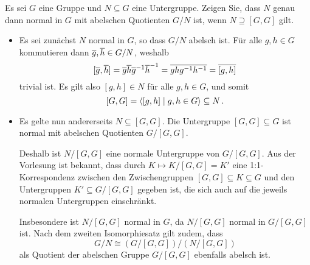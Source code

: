 \begin{question}[subtitle = Abelsche Quotienten]
  Es sei $G$ eine Gruppe und $N \subseteq G$ eine Untergruppe.
  Zeigen Sie, dass $N$ genau dann normal in $G$ mit abelschen Quotienten $G/N$ ist, wenn $N \supseteq [G,G]$ gilt.
\end{question}


\begin{solution}
  \begin{itemize}
    \item
      Es sei zunächst $N$ normal in $G$, so dass $G/N$ abelsch ist.
      Für alle $g, h \in G$ kommutieren dann $\overline{g}, \overline{h} \in G/N$, weshalb
      \[
          [\overline{g}, \overline{h}]
        = \overline{g} \overline{h} \overline{g}^{-1} \overline{h}^{-1}
        = \overline{g h g^{-1} h^{-1}}
        = \overline{[g,h]}
      \]
      trivial ist.
      Es gilt also $[g,h] \in N$ für alle $g, h \in G$, und somit
      \[
                  [G,G]
        =         \langle [g,h] \mid g, h \in G \rangle
        \subseteq N \,.
      \]
    \item
      Es gelte nun andererseits $N \subseteq [G,G]$.
      Die Untergruppe $[G,G] \subseteq G$ ist normal mit abelschen Quotienten $G/[G,G]$.
      
      Deshalb ist $N/[G,G]$ eine normale Untergruppe von $G/[G,G]$.
      Aus der Vorlesung ist bekannt, dass durch $K \mapsto K/[G,G] = K'$ eine 1:1-Korrespondenz zwischen den Zwischengruppen $[G,G] \subseteq K \subseteq G$ und den Untergruppen $K' \subseteq G/[G,G]$ gegeben ist, die sich auch auf die jeweils normalen Untergruppen einschränkt.
      
      Insbesondere ist $N/[G,G]$ normal in $G$, da $N/[G,G]$ normal in $G/[G,G]$ ist.
      Nach dem zweiten Isomorphiesatz gilt zudem, dass
      \[
              G/N
        \cong (G/[G,G])/(N/[G,G])
      \]
      als Quotient der abelschen Gruppe $G/[G,G]$ ebenfalls abelsch ist.
  \end{itemize}
\end{solution}


